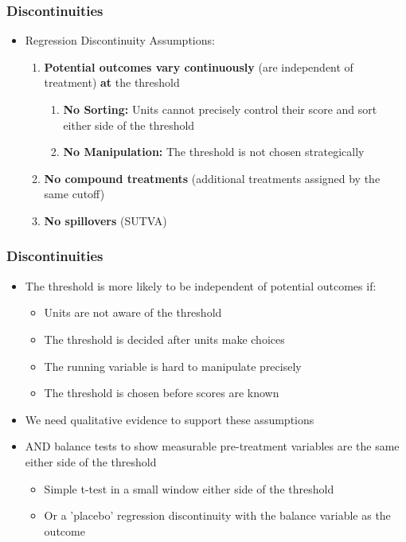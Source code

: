 \documentclass[xcolor=x11names,compress]{beamer}\usepackage[]{graphicx}\usepackage[]{color}
\renewcommand{\(}{\begin{columns}}
\renewcommand{\)}{\end{columns}}
\newcommand{\<}[1]{\begin{column}{#1}}
\renewcommand{\>}{\end{column}}
\begin{document}
\begin{frame}
\frametitle{Discontinuities}
\begin{itemize}
\item Regression Discontinuity Assumptions:
\begin{enumerate}
\item \textbf{Potential outcomes vary continuously} (are independent of treatment) \textbf{at} the threshold
\begin{enumerate}
\pause
\item \textbf{No Sorting:} Units cannot precisely control their score and sort either side of the threshold
\pause
\item \textbf{No Manipulation:} The threshold is not chosen strategically
\end{enumerate}
\pause
\item \textbf{No compound treatments} (additional treatments assigned by the same cutoff)
\pause
\item \textbf{No spillovers} (SUTVA)
\end{enumerate}
\end{itemize}
\end{frame}

\begin{frame}
\frametitle{Discontinuities}
\begin{itemize}
\item The threshold is more likely to be independent of potential outcomes if:
\pause
\begin{itemize}
\item Units are not aware of the threshold
\pause
\item The threshold is decided after units make choices
\pause
\item The running variable is hard to manipulate precisely
\pause
\item The threshold is chosen before scores are known
\pause
\end{itemize}
\item We need qualitative evidence to support these assumptions
\pause
\item AND balance tests to show measurable pre-treatment variables are the same either side of the threshold
\pause
\begin{itemize}
\item Simple t-test in a small window either side of the threshold
\pause
\item Or a 'placebo' regression discontinuity with the balance variable as the outcome
\end{itemize}
\end{itemize}
\end{frame}
\end{document}
